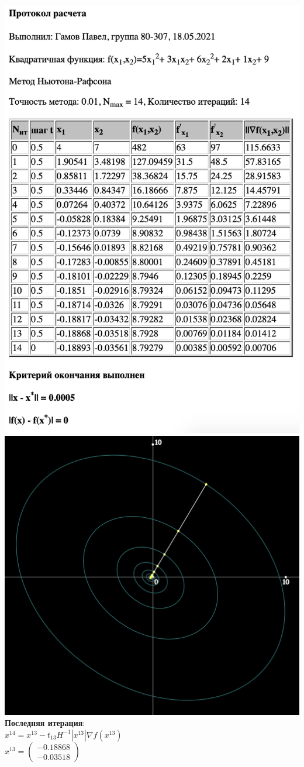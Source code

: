 \includegraphics[width=0.8\linewidth]{images/3_prot}\\
\includegraphics[width=0.8\linewidth]{images/3_graf}\\

\textbf{Последняя итерация}:\\
$x^{14} = x^{13} - t_{13}H^{-1}|x^{13}| \nabla f(x^{13})$\\
$x^{13} = 
\begin{pmatrix}
  -0.18868\\
  -0.03518
\end{pmatrix}
$\\

